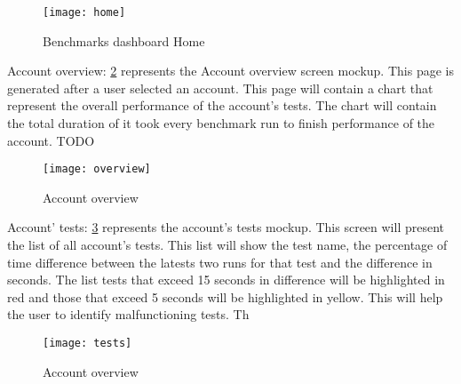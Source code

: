 \begin{figure}[h]
\texttt{[image: home]}
\caption{Benchmarks dashboard Home}
\label{fig:benchmarks_dashboard_home}
\end{figure}

Account overview:
\hyperref[fig:benchmarks_dashboard_overview]{\ref{fig:benchmarks_dashboard_overview}}
represents the Account overview screen mockup. This page is generated after a
user selected an account. This page will contain a chart that represent the
overall performance of the account's tests. The chart will contain the total
duration of it took every benchmark run to finish 
performance of the account. TODO

\begin{figure}[h]
\texttt{[image: overview]}
\caption{Account overview}
\label{fig:benchmarks_dashboard_overview}
\end{figure}


Account' tests:
\hyperref[fig:benchmarks_dashboard_tests]{\ref{fig:benchmarks_dashboard_tests}}
represents the account's tests mockup. This screen will present the list of all
account's tests. This list will show the test name, the percentage of time
difference between the latests two runs for that test and the difference in
seconds. The list tests that exceed 15 seconds in difference will be highlighted
in red and those that exceed 5 seconds will be highlighted in yellow. This will
help the user to identify malfunctioning tests. Th

\begin{figure}[h]
\texttt{[image: tests]}
\caption{Account overview}
\label{fig:benchmarks_dashboard_tests}
\end{figure}

